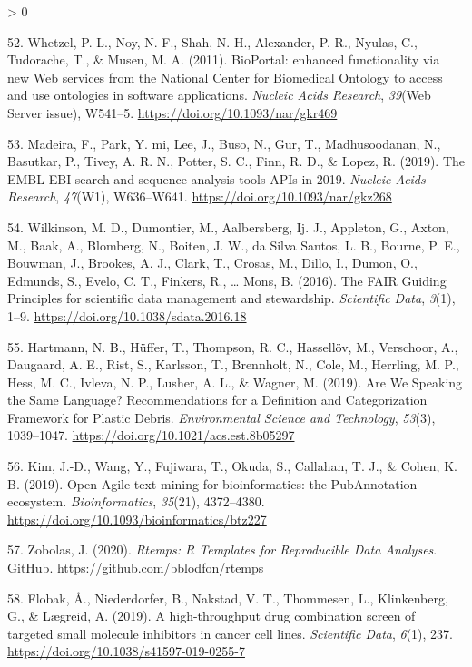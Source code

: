 \documentclass[
  12pt,
]{book}
\newlength{\cslhangindent}
\newenvironment{CSLReferences}[2] %
 {%
  \setlength{\parindent}{0pt}
  \ifodd #1 \everypar{\setlength{\hangindent}{\cslhangindent}}\ignorespaces\fi
  \ifnum #2 > 0
  \setlength{\parskip}{#2\baselineskip}
  \fi
 }%
 {}
\begin{document}
\begin{CSLReferences}{1}{0}
\leavevmode\hypertarget{ref-Whetzel2011}{}%
52. Whetzel, P. L., Noy, N. F., Shah, N. H., Alexander, P. R., Nyulas, C., Tudorache, T., \& Musen, M. A. (2011). {BioPortal: enhanced functionality via new Web services from the National Center for Biomedical Ontology to access and use ontologies in software applications.} \emph{Nucleic Acids Research}, \emph{39}(Web Server issue), W541--5. \url{https://doi.org/10.1093/nar/gkr469}

\leavevmode\hypertarget{ref-Madeira2019}{}%
53. Madeira, F., Park, Y. mi, Lee, J., Buso, N., Gur, T., Madhusoodanan, N., Basutkar, P., Tivey, A. R. N., Potter, S. C., Finn, R. D., \& Lopez, R. (2019). {The EMBL-EBI search and sequence analysis tools APIs in 2019}. \emph{Nucleic Acids Research}, \emph{47}(W1), W636--W641. \url{https://doi.org/10.1093/nar/gkz268}

\leavevmode\hypertarget{ref-Wilkinson2016}{}%
54. Wilkinson, M. D., Dumontier, M., Aalbersberg, Ij. J., Appleton, G., Axton, M., Baak, A., Blomberg, N., Boiten, J. W., da Silva Santos, L. B., Bourne, P. E., Bouwman, J., Brookes, A. J., Clark, T., Crosas, M., Dillo, I., Dumon, O., Edmunds, S., Evelo, C. T., Finkers, R., \ldots{} Mons, B. (2016). {The FAIR Guiding Principles for scientific data management and stewardship}. \emph{Scientific Data}, \emph{3}(1), 1--9. \url{https://doi.org/10.1038/sdata.2016.18}

\leavevmode\hypertarget{ref-Hartmann2019}{}%
55. Hartmann, N. B., Hüffer, T., Thompson, R. C., Hassellöv, M., Verschoor, A., Daugaard, A. E., Rist, S., Karlsson, T., Brennholt, N., Cole, M., Herrling, M. P., Hess, M. C., Ivleva, N. P., Lusher, A. L., \& Wagner, M. (2019). {Are We Speaking the Same Language? Recommendations for a Definition and Categorization Framework for Plastic Debris}. \emph{Environmental Science and Technology}, \emph{53}(3), 1039--1047. \url{https://doi.org/10.1021/acs.est.8b05297}

\leavevmode\hypertarget{ref-Kim2019}{}%
56. Kim, J.-D., Wang, Y., Fujiwara, T., Okuda, S., Callahan, T. J., \& Cohen, K. B. (2019). {Open Agile text mining for bioinformatics: the PubAnnotation ecosystem}. \emph{Bioinformatics}, \emph{35}(21), 4372--4380. \url{https://doi.org/10.1093/bioinformatics/btz227}

\leavevmode\hypertarget{ref-rtemps}{}%
57. Zobolas, J. (2020). \emph{{Rtemps: R Templates for Reproducible Data Analyses}}. GitHub. \url{https://github.com/bblodfon/rtemps}

\leavevmode\hypertarget{ref-Flobak2019}{}%
58. Flobak, Å., Niederdorfer, B., Nakstad, V. T., Thommesen, L., Klinkenberg, G., \& Lægreid, A. (2019). {A high-throughput drug combination screen of targeted small molecule inhibitors in cancer cell lines}. \emph{Scientific Data}, \emph{6}(1), 237. \url{https://doi.org/10.1038/s41597-019-0255-7}


\end{CSLReferences}
\end{document}
